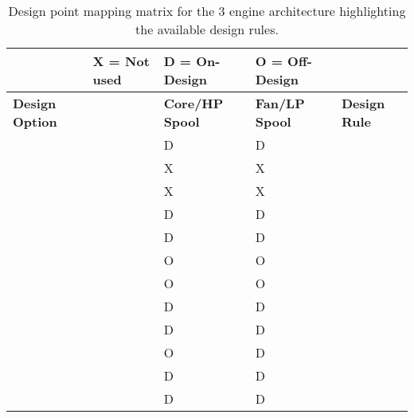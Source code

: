 			\begin{table}[htp, scale = 0.8]
				\renewcommand{\arraystretch}{1.5}%
				\centering
				\begin{tabular}{ >{\centering}P{3.0cm} | >{\centering}P{2.5cm} >{\centering}P{3cm} >{\centering}P{3cm}  >{\centering \arraybackslash}P{2.cm}}
						   & X = Not used  & D = On-Design      &  O = Off-Design   &  \\
					\hline \hline
					\bf{Design Option} &               & \bf{Core/HP Spool} & \bf{Fan/LP Spool} & \bf{Design Rule} \\
					\hline
						   &        & D & D &  \\
						   &        & X & X &  \\
		                   &        & X & X &  \\
					 &       & D & D &  \\
					\hline
		                   &        & D & D &  \\
		                   &       & O & O &  \\
		                   &        & O & O &  \\
					&       & D & D &  \\
					\hline
		                   &        & D & D &  \\
					&       & O & D &  \\
		                   &        & D & D &  \\				          
					&       & D & D &  \\					                   
					\hline
					\hline
				\end{tabular}
				\caption{Design point mapping matrix for the 3 engine architecture highlighting the available design rules.}
				\label{N2A_3_Engine_Options}
			\end{table}  		

